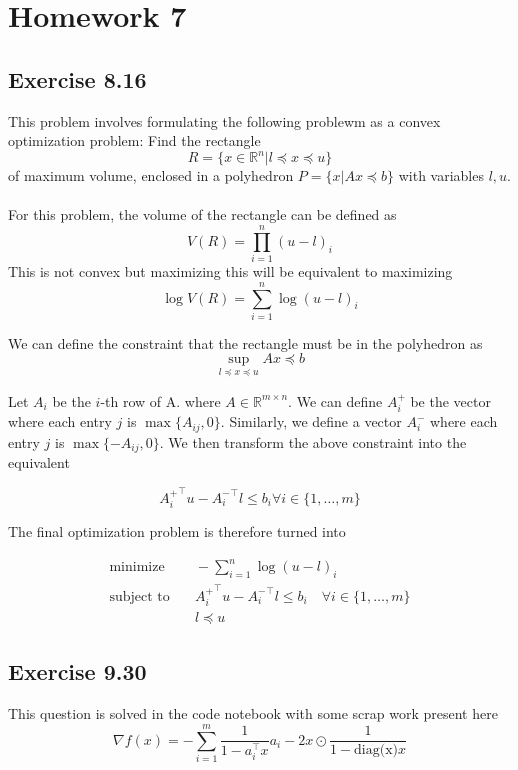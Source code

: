 \section{Homework 7}

\subsection{Exercise 8.16}
This problem involves formulating the following problewm as a convex optimization problem: Find the rectangle
\begin{equation}
    R = \{ x \in \mathbb{R}^n | l \preceq x \preceq u  \}
\end{equation}
of maximum volume, enclosed in a polyhedron $P = \{ x | Ax \preceq b \}$ with variables $l, u$.
\\ \\
For this problem, the volume of the rectangle can be defined as 
\begin{equation}
    V(R) = \prod_{i=1}^{n} (u-l)_i
\end{equation}
This is not convex but maximizing this will be equivalent to maximizing
\begin{equation}
    \log V(R) = \sum_{i=1}^n \log (u - l)_i
\end{equation}

We can define the constraint that the rectangle must be in the polyhedron as
\begin{equation}
    \sup_{ l \preceq x \preceq u} Ax  \preceq b 
\end{equation}

Let $A_i$ be the  $i$-th row of A. where $A \in \mathbb{R}^{m \times n}$. We can define $A_i^+$ be the vector where each entry $j$ is $\max\{A_{ij}, 0\}$. Similarly, we define a vector $A_{i}^-$ where each entry $j$ is $\max\{ -A_{ij},0 \}$. We then transform the above constraint into the equivalent

\begin{equation}
    {A_i^+}^\top u - {A_i^-}^\top l \leq b_i \forall i \in \{ 1,\dots, m \}
\end{equation}

The final optimization problem is therefore turned into

\begin{align}
  \text{minimize} & \quad - \sum_{i=1}^n \log(u - l)_i \\
  \text{subject to} & \quad {A_i^+}^\top u - {A_i^-}^\top l \leq b_i \quad \forall i \in \{ 1,\dots, m \} \\
  & \quad l \preceq u
\end{align}

\subsection{Exercise 9.30}
This question is solved in the code notebook with some scrap work present here
\begin{equation}
    \nabla f(x) = -\sum_{i=1}^m \frac{1}{1-a_i^\top x} a_i - 2x \odot \frac{1}{1 - \text{diag(x)}x}
\end{equation}